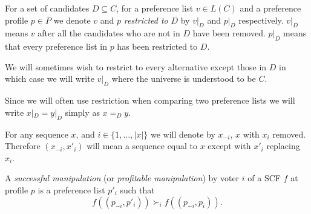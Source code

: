 	\begin{definition}
		\label{preference-restriction-definition}
		For a set of candidates $D \subseteq C$, for a preference list $v \in L(C)$ and a preference profile $p \in P$ we denote $v$ and $p$ \emph{restricted to} $D$ by $v|_D$ and $p|_D$ respectively. $v|_D$ means $v$ after all the candidates who are not in $D$ have been removed. $p|_D$ means that every preference list in $p$ has been restricted to $D$.

		We will sometimes wish to restrict to every alternative except those in $D$ in which case we will write $v|_{\overline{D}}$ where the universe is understood to be $C$.

		Since we will often use restriction when comparing two preference lists we will write $x|_D = y|_D$ simply as $x =_D y$.
	\end{definition}

	\begin{definition}
		For any sequence $x$, and $i \in \{1, \ldots, |x|\}$ we will denote by $x_{-i}$, $x$ with $x_i$ removed. Therefore $(x_{-i}, x'_i)$ will mean a sequence equal to $x$ except with $x'_i$ replacing $x_i$.
	\end{definition}

	\begin{definition}
		\label{manipulation-definition}
		A \emph{successful manipulation} (or \emph{profitable manipulation}) by voter $i$ of a SCF $f$ at profile $p$ is a preference list $p'_i$ such that
		\[
			f((p_{-i}, p'_i)) \succ_i f((p_{-i}, p_i)).
		\]
	\end{definition}
